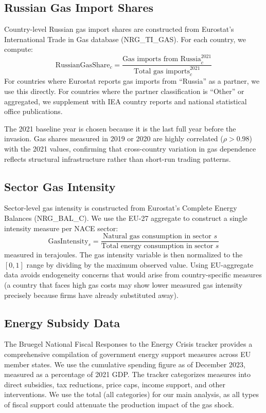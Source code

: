 \documentclass[12pt]{article}
\begin{document}
\subsection{Russian Gas Import Shares}

Country-level Russian gas import shares are constructed from Eurostat's International Trade in Gas database (NRG\_TI\_GAS). For each country, we compute:
\begin{equation}
    \text{RussianGasShare}_c = \frac{\text{Gas imports from Russia}_c^{2021}}{\text{Total gas imports}_c^{2021}}
\end{equation}
For countries where Eurostat reports gas imports from ``Russia'' as a partner, we use this directly. For countries where the partner classification is ``Other'' or aggregated, we supplement with IEA country reports and national statistical office publications.

The 2021 baseline year is chosen because it is the last full year before the invasion. Gas shares measured in 2019 or 2020 are highly correlated ($\rho > 0.98$) with the 2021 values, confirming that cross-country variation in gas dependence reflects structural infrastructure rather than short-run trading patterns.

\subsection{Sector Gas Intensity}

Sector-level gas intensity is constructed from Eurostat's Complete Energy Balances (NRG\_BAL\_C). We use the EU-27 aggregate to construct a single intensity measure per NACE sector:
\begin{equation}
    \text{GasIntensity}_s = \frac{\text{Natural gas consumption in sector } s}{\text{Total energy consumption in sector } s}
\end{equation}
measured in terajoules. The gas intensity variable is then normalized to the $[0, 1]$ range by dividing by the maximum observed value. Using EU-aggregate data avoids endogeneity concerns that would arise from country-specific measures (a country that faces high gas costs may show lower measured gas intensity precisely because firms have already substituted away).

\subsection{Energy Subsidy Data}

The Bruegel National Fiscal Responses to the Energy Crisis tracker provides a comprehensive compilation of government energy support measures across EU member states. We use the cumulative spending figure as of December 2023, measured as a percentage of 2021 GDP. The tracker categorizes measures into direct subsidies, tax reductions, price caps, income support, and other interventions. We use the total (all categories) for our main analysis, as all types of fiscal support could attenuate the production impact of the gas shock.
\end{document}
